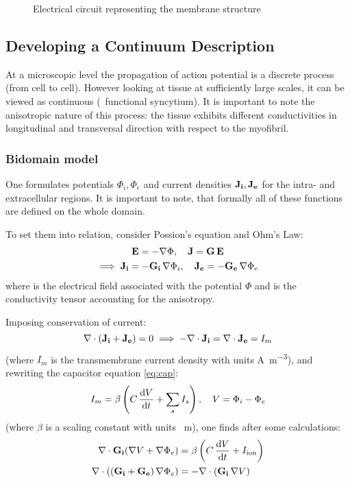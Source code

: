 \begin{figure}[h!]
    \centering
    
    \caption{Electrical circuit representing the membrane structure}
    \label{fig:circut}
\end{figure}


\subsection{Developing a Continuum Description}
At a microscopic level the propagation of action potential is a discrete
process (from cell to cell). However looking at tissue at sufficiently
large scales, it can be viewed as continuous (\textrightarrow~functional
syncytium). It is important to note the anisotropic nature of this process:
the tissue exhibits different conductivities in longitudinal and transversal
direction with respect to the myofibril.

\subsubsection{Bidomain model}
One formulates potentials $\Phi_i, \Phi_e$ and current densities $\mathbf{J_i},
\mathbf{J_e}$ for the intra- and extracellular regions.  It is important to
note, that formally all of these functions are defined on the whole domain.

To set them into relation, consider Possion's equation and Ohm's Law:
\begin{gather*}
    \mathbf{E}=-\nabla\Phi,\quad \mathbf{J}=\mathbf{G}\,\mathbf{E} \\
    \implies \mathbf{J_i}=-\mathbf{G_i}\,\nabla\Phi_i,\quad
    \mathbf{J_e}=-\mathbf{G_e}\,\nabla\Phi_e
\end{gather*}
where  is the electrical field associated with the potential $\Phi$
and  is the conductivity tensor accounting for the anisotropy.

Imposing conservation of current:
\begin{equation*}
    \nabla\cdot(\mathbf{J_i}+\mathbf{J_e})=0 \implies
    -\nabla\cdot\mathbf{J_i}=\nabla\cdot\mathbf{J_e}=I_m
\end{equation*}
(where $I_m$ is the transmembrane current density with units
\si{\ampere\per\metre\cubed}), and rewriting the capacitor equation
\eqref{eq:cap}:
\begin{equation*}
    I_m=\beta\left(C\,\dv{V}{t}+\sum_{s}I_{s}\right),\quad V=\Phi_i-\Phi_e
\end{equation*}
(where $\beta$ is a scaling constant with units \si{\per\metre}), one finds
after some calculations:
\begin{subequations}
\begin{align}
    \nabla\cdot\mathbf{G_i}(\nabla{V}+\nabla\Phi_e)
    &=\beta\left(C\,\dv{V}{t}+I_{\mathrm{ion}}\right)
    \label{eq:i}
    \\
    \nabla\cdot\left((\mathbf{G_i}+\mathbf{G_e})\,\nabla\Phi_e\right)
    &=-\nabla\cdot(\mathbf{G_i}\,\nabla{V})
    \label{eq:ii}
\end{align}
\end{subequations}

